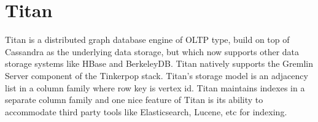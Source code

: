 \section{Titan}
Titan\cite{Titan} is a distributed graph database engine of OLTP type, build on top of Cassandra as the underlying data storage, but which now supports other data storage systems like HBase and BerkeleyDB. Titan natively supports the Gremlin Server component of the Tinkerpop stack. Titan’s storage model is an adjacency list in a column family where row key is vertex id. Titan maintains indexes in a separate column family and one nice feature of Titan is its ability to accommodate third party tools like Elasticsearch, Lucene, etc for indexing. 